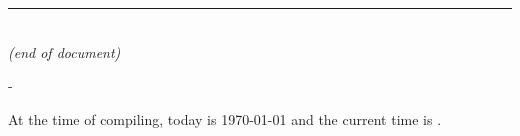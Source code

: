    \begin{singlespace}
         \begin{center}
           \rule[0 pt]{\linewidth}{0.5pt}\\	
             \textit{(end of document)}\\
      \vspace*{\fill}
%
%
\begin{changemargin}{-\marginparwidth}%
{%
\begin{center}
At the time of compiling, today is \longusdate\today{} and the current time is \currenttime{} 
% 
\timezone.%
\end{center}
}
\end{changemargin}
\end{center}
\end{singlespace}
